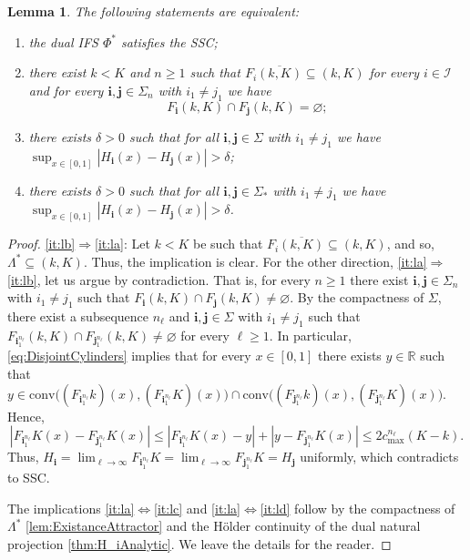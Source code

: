 \documentclass[11pt,]{article}
\def\cref#1{\ref{#1}}%
\newtheorem{lemma}[theorem]{Lemma}
\theoremstyle{definition}
\theoremstyle{remark}
\newcommand{\0}{\mathbf{0}}
\newcommand{\bi}{\mathbf{i}}
\newcommand{\bj}{\mathbf{j}}
\numberwithin{equation}{section}
\begin{document}
\begin{lemma}\label{lem:SSCEequiv}
The following statements are equivalent: 
\begin{enumerate}[label=(\alph*)]
\item\label{it:la} the dual IFS $\Phi^*$ satisfies the SSC;
\item\label{it:lb} there exist $k<K$ and $n\geq1$ such that $F_{i}\overline{(k,K)}\subseteq(k,K)$ for every
  $i\in\mathcal{I}$ and for every $\bi,\bj\in\Sigma_n$ with $i_1\neq j_1$ we have
\begin{equation*}
	F_{\bi}(k,K)\cap F_{\bj}(k,K)=\varnothing; 
\end{equation*}
\item\label{it:lc} there exists $\delta>0$ such that for all $\bi,\bj \in\Sigma$ with $i_1\neq j_1$ we have
  $\sup_{x\in[0,1]} |H_{\bi}(x) - H_{\bj}(x)| > \delta$;
\item\label{it:ld} there exists $\delta>0$ such that for all $\bi,\bj \in\Sigma_*$ with $i_1\neq j_1$ we have
  $\sup_{x\in[0,1]} |H_{\bi}(x) - H_{\bj}(x)| > \delta$.
\end{enumerate}
\end{lemma}


\begin{proof}
  \cref{it:lb}$\Rightarrow$\cref{it:la}: Let $k<K$ be such that
  $F_{i}\overline{(k,K)}\subseteq(k,K)$, and so, $\Lambda^*\subseteq(k,K)$. Thus, the
  implication  is clear. For the other direction, \cref{it:la}$\Rightarrow$\cref{it:lb}, let us
  argue by contradiction. That is, for every $n\geq1$ there exist $\bi,\bj\in\Sigma_n$ with
  $i_1\neq j_1$ such that $F_{\bi}(k,K)\cap F_{\bj}(k,K)\neq\varnothing$. By the compactness
  of $\Sigma$, there exist a subsequence $n_\ell$ and $\bi,\bj\in\Sigma$ with $i_1\neq j_1$
  such that $F_{\bi_1^{n_\ell}}(k,K)\cap F_{\bj_1^{n_\ell}}(k,K)\neq\varnothing$ for every
  $\ell\geq1$. In particular, \cref{eq:DisjointCylinders} implies that for every $x\in[0,1]$
  there exists $y\in\mathbb{R}$ such that $y\in\mathrm{conv}\big((F_{\bi_1^{n_\ell}}k)(x),
    (F_{\bi_1^{n_\ell}}K)(x)\big) \cap \mathrm{conv}\big((F_{\bj_1^{n_\ell}}k)(x),
  (F_{\bj_1^{n_\ell}}K)(x)\big)$. Hence,
  $$
  |F_{\bi_1^{n_\ell}}K(x)-F_{\bj_1^{n_\ell}}K(x)|\leq
  |F_{\bi_1^{n_\ell}}K(x)-y|+|y-F_{\bj_1^{n_\ell}}K(x)|\leq 2c_{\max}^{n_\ell}(K-k).
  $$
  Thus,
  $H_{\bi}=\lim_{\ell\to\infty}F_{\bi_1^{n_\ell}}K=\lim_{\ell\to\infty}F_{\bj_1^{n_\ell}}K=H_{\bj}$
  uniformly, which contradicts to SSC.

  The implications \cref{it:la}$\Leftrightarrow$\cref{it:lc} and
  \cref{it:la}$\Leftrightarrow$\cref{it:ld} follow by the compactness of $\Lambda^*$
  \cref{lem:ExistanceAttractor} and the H\"older continuity of the dual natural projection
  \cref{thm:H_iAnalytic}. We leave the details for the reader.
\end{proof}
\end{document}
